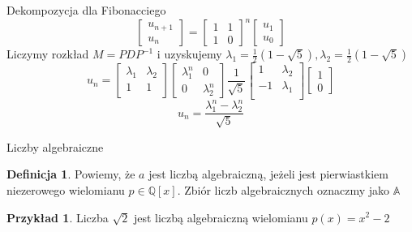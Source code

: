 \documentclass[handout]{beamer}
\def\Q{\mathbb{Q}}
\theoremstyle{definition}
\newtheorem*{definicja}{Definicja}
\newtheorem*{przyklad}{Przykład}
\theoremstyle{named}
\begin{document}
\begin{frame}{Dekompozycja dla Fibonacciego}
    \begin{equation*}
        \begin{bmatrix}
        u_{n+1} \\
        u_{n}
        \end{bmatrix}
        = 
        \begin{bmatrix}
        1 & 1\\
        1 & 0
        \end{bmatrix}^n
        \begin{bmatrix}
        u_1 \\
        u_0 
        \end{bmatrix}

    \end{equation*}
    Liczymy rozkład $M = PDP^{-1}$ i uzyskujemy $\lambda_1 =  \frac{1}{2} \left(1-\sqrt{5}\right), \lambda_2 = \frac{1}{2} \left(1-\sqrt{5}\right) $
\begin{equation*}
    u_n = 
        \begin{bmatrix}
            \lambda_1 & \lambda_2 \\
         1 & 1 \\
        \end{bmatrix}
        \begin{bmatrix}
           \lambda_1^{n} & 0 \\
            0 & \lambda_2^{n}
        \end{bmatrix}
        \frac{1}{\sqrt{5}}
        \begin{bmatrix}
           1 & \lambda_2 \\
           -1  & \lambda_1 \\
        \end{bmatrix} 
        \begin{bmatrix}
           1 \\
           0
        \end{bmatrix}
    \end{equation*}
    \begin{equation*}
        u_n = \frac{\lambda_1^{n} - \lambda_2^{n}}{\sqrt{5}}
    \end{equation*}
 
 
\end{frame}

\begin{frame}{Liczby algebraiczne}
\begin{definicja}
    Powiemy, że $a $ jest liczbą algebraiczną, jeżeli jest pierwiastkiem niezerowego wielomianu $p \in \Q[x]$. Zbiór liczb algebraicznych oznaczmy jako $\mathbb{A}$
\end{definicja}

\begin{przyklad}
    Liczba $\sqrt{2}$ jest liczbą algebraiczną wielomianu $p(x) = x^{2} - 2$
\end{przyklad}

\end{frame}
\end{document}
